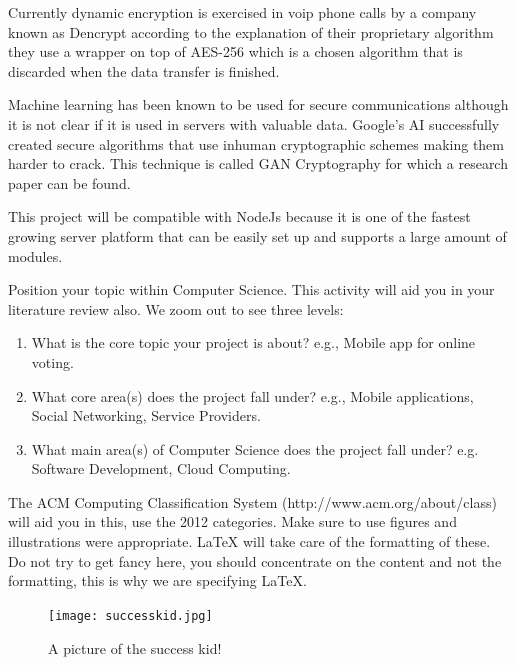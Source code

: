 Currently dynamic encryption is exercised in voip phone calls by a company known as Dencrypt \cite{dencrypt} according to the explanation of their proprietary algorithm they use a wrapper on top of AES-256 which is a chosen algorithm that is discarded when the data transfer is finished.

Machine learning has been known to be used for secure communications although it is not clear if it is used in servers with valuable data. Google's AI successfully created secure algorithms \cite{GoogleAi1} that use inhuman cryptographic schemes making them harder to crack. This technique is called GAN Cryptography \cite{GoogleAi2} for which a research paper can be found.

This project will be compatible with NodeJs because it is one of the fastest growing server platform \cite{NodeJs} that can be easily set up and supports a large amount of modules.




Position your topic within Computer Science. This activity will aid you in your literature review also. We zoom out to see three levels:

\begin{enumerate}
    \item What is the core topic your project is about? e.g., Mobile app for online voting.
    \item What core area(s) does the project fall under? e.g., Mobile applications, Social Networking, Service Providers. 
    \item What main area(s) of Computer Science does the project fall under? e.g. Software Development, Cloud Computing.
\end{enumerate}

The ACM Computing Classification System (http://www.acm.org/about/class) will aid you in this, use the 2012 categories. Make sure to use figures and illustrations were appropriate. LaTeX will take care of the formatting of these. Do not try to get fancy here, you should concentrate on the content and not the formatting, this is why we are specifying LaTeX.

\begin{figure}[ht]
  \centering
      \texttt{[image: successkid.jpg]}
  \caption[A picture of the success kid!]{A picture of the success kid!\cite{Reference1}}
  \label{fig:successkid}
\end{figure}

